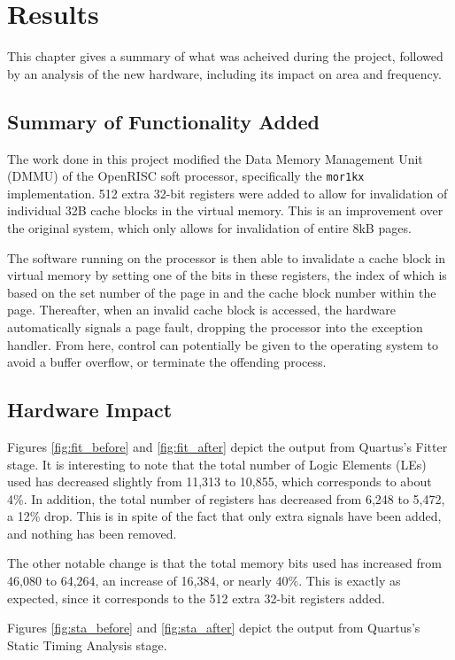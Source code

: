 \chapter{Results}
\label{cha:results}
This chapter gives a summary of what was acheived during the project, followed by an analysis of the new hardware, including its impact on area and frequency.

\section{Summary of Functionality Added}
The work done in this project modified the Data Memory Management Unit (DMMU) of the OpenRISC soft processor, specifically the \texttt{mor1kx} implementation.
512 extra 32-bit registers were added to allow for invalidation of individual 32B cache blocks in the virtual memory. This is an improvement over the original system, which only allows for invalidation of entire 8kB pages.

The software running on the processor is then able to invalidate a cache block in virtual memory by setting one of the bits in these registers, the index of which is based on the set number of the page in and the cache block number within the page.
Thereafter, when an invalid cache block is accessed, the hardware automatically signals a page fault, dropping the processor into the exception handler. From here, control can potentially be given to the operating system to avoid a buffer overflow, or terminate the offending process.

\section{Hardware Impact}
Figures \ref{fig:fit_before} and \ref{fig:fit_after} depict the output from Quartus's Fitter stage. It is interesting to note that the total number of Logic Elements (LEs) used has decreased slightly from 11,313 to 10,855, which corresponds to about 4\%. In addition, the total number of registers has decreased from 6,248 to 5,472, a 12\% drop. This is in spite of the fact that only extra signals have been added, and nothing has been removed.

The other notable change is that the total memory bits used has increased from 46,080 to 64,264, an increase of 16,384, or nearly 40\%. This is exactly as expected, since it corresponds to the 512 extra 32-bit registers added.

Figures \ref{fig:sta_before} and \ref{fig:sta_after} depict the output from Quartus's Static Timing Analysis stage.

